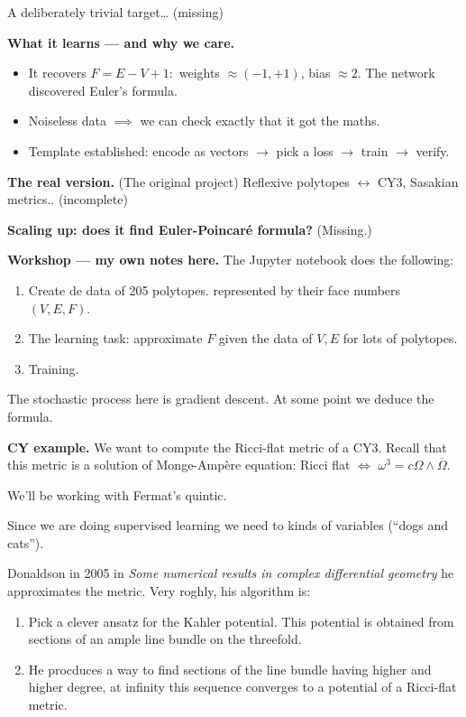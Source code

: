 \noindent
A deliberately trivial target… (missing)

\medskip\noindent
{\bf What it learns --- and why we care.}
\begin{itemize}
\item It recovers $F=E-V+1:$
weights $\approx (-1,+1)$, bias
$\approx 2$. The network discovered Euler's
formula.
\item Noiseless data $\implies $
we can check exactly that it got the maths.
\item Template established: encode as
vectors $\to$ pick a loss $\to$ train
$\to$ verify.
\end{itemize}

\noindent
{\bf The real version.}
(The original project) Reflexive polytopes
$\leftrightarrow$ CY3, Sasakian metrics..
(incomplete)

\medskip\noindent
{\bf Scaling up: does it find Euler-Poincaré
formula?} (Missing.)

\medskip\noindent
{\bf Workshop --- my own notes here.} 
The Jupyter notebook does the following:
\begin{enumerate}
\item Create de data of 205 polytopes.
represented by their
  face numbers $(V,E,F)$.
\item The learning task:  approximate
$F$ given the data of $V,E$ for lots
of polytopes.
\item Training.
\end{enumerate}

\noindent
The stochastic process here is
gradient descent. At some point
we deduce the formula.

\medskip\noindent
{\bf CY example.}
We want to compute the Ricci-flat metric
of a CY3. Recall that this metric 
is a solution of Monge-Ampère
equation: Ricci flat $\iff$
$\omega^3 = c \Omega \wedge
\overline{\Omega}$.

We'll be working with Fermat's quintic.

Since we are doing supervised learning
we need to kinds of variables
(``dogs and cats'').

Donaldson in 2005 in {\it Some numerical
results in complex differential geometry}
he approximates the metric. Very 
roghly, his algorithm is:

\begin{enumerate}
\item Pick a clever ansatz for the Kahler
potential. This potential is obtained from
sections of an ample line bundle on the
threefold.

\item He procduces a way to find sections of
the line bundle having higher and higher
degree, at infinity this sequence converges
to a potential of a Ricci-flat metric.
\end{enumerate}

